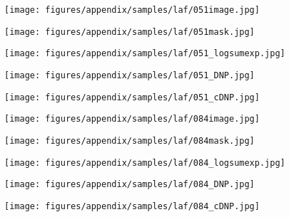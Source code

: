 \documentclass[10pt,twocolumn,letterpaper]{article}
\begin{document}
\begin{figure*}[h!]
    \begin{subfigure}[b]{0.175\textwidth}
        \centering
        \texttt{[image: figures/appendix/samples/laf/051image.jpg]}
    \end{subfigure}
    \begin{subfigure}[b]{0.175\textwidth}
        \centering
        \texttt{[image: figures/appendix/samples/laf/051mask.jpg]}
    \end{subfigure}
    \begin{subfigure}[b]{0.175\textwidth}
        \centering
        \texttt{[image: figures/appendix/samples/laf/051\_logsumexp.jpg]}
    \end{subfigure}
    \begin{subfigure}[b]{0.175\textwidth}
        \centering
        \texttt{[image: figures/appendix/samples/laf/051\_DNP.jpg]}
    \end{subfigure}
    \begin{subfigure}[b]{0.175\textwidth}
        \centering
        \texttt{[image: figures/appendix/samples/laf/051\_cDNP.jpg]}
    \end{subfigure}
    


    \begin{subfigure}[b]{0.175\textwidth}
        \centering
        \texttt{[image: figures/appendix/samples/laf/084image.jpg]}
    \end{subfigure}
    \begin{subfigure}[b]{0.175\textwidth}
        \centering
        \texttt{[image: figures/appendix/samples/laf/084mask.jpg]}
    \end{subfigure}
    \begin{subfigure}[b]{0.175\textwidth}
        \centering
        \texttt{[image: figures/appendix/samples/laf/084\_logsumexp.jpg]}
    \end{subfigure}
    \begin{subfigure}[b]{0.175\textwidth}
        \centering
        \texttt{[image: figures/appendix/samples/laf/084\_DNP.jpg]}
    \end{subfigure}
    \begin{subfigure}[b]{0.175\textwidth}
        \centering
        \texttt{[image: figures/appendix/samples/laf/084\_cDNP.jpg]}
    \end{subfigure}
    

\end{figure*}
\end{document}
